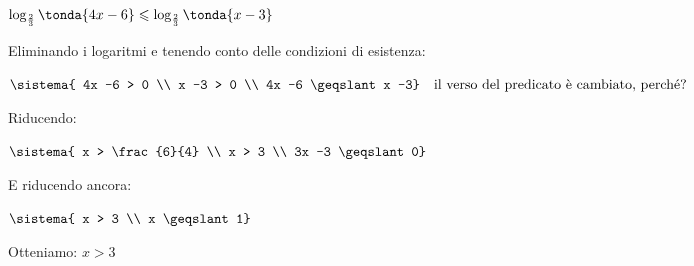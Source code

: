 \begin{esempio}
 \(\log_{\frac{2}{3}} \tonda{4x -6} \leqslant \log_{\frac{2}{3}} \tonda{x -3}\)

Eliminando i logaritmi e tenendo conto delle condizioni di esistenza:

\(\sistema{
4x -6 > 0 \\
x -3 > 0 \\
4x -6 \geqslant x -3} \quad \text{il verso del predicato è cambiato, perché?}\) 

Riducendo:

\(\sistema{
x > \frac{6}{4} \\
x > 3 \\
3x -3 \geqslant 0}\)

E riducendo ancora:

\(\sistema{
x > 3 \\
x \geqslant 1}\)

Otteniamo: \quad \(x > 3\)

\end{esempio}

